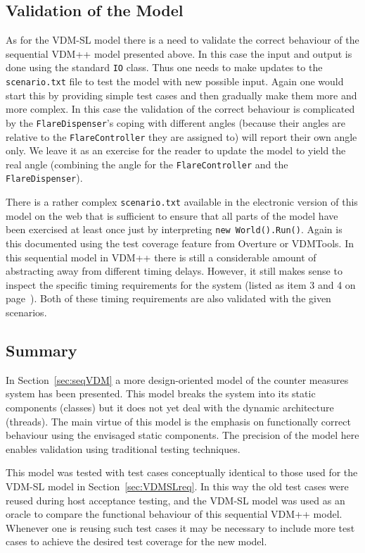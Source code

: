 \documentclass{overturerepchap}
\newcommand{\VDMTools}{VDMTools}
\begin{document}
\subsection{Validation of the Model}

As for the VDM-SL model there is a need to validate the correct behaviour
of the sequential VDM++ model presented above. In this case the input
and output is done using the standard \texttt{IO} class. Thus one needs
to make updates to the \texttt{scenario.txt} file to test the model with
new possible input. Again one would start this by providing simple test
cases and then gradually make them more and more complex. In this case
the validation of the correct behaviour is complicated by the 
\texttt{FlareDispenser}'s coping with different angles (because their 
angles are relative to the \texttt{FlareController} they are assigned to)
will report their own angle only. We leave it as an exercise for the
reader to update the model to yield the real angle (combining the angle
for the \texttt{FlareController} and the \texttt{FlareDispenser}).

There is a rather complex \texttt{scenario.txt} available in the electronic
version of this model on the web that is sufficient to ensure that all parts of the
model have been exercised at least once just by interpreting
\texttt{new World().Run()}. Again is this documented using the
test coverage feature from Overture or 
\VDMTools. In this sequential model in VDM++
there is still a considerable amount of
abstracting away from different timing delays. However, it still makes
sense to inspect the specific timing requirements for the system 
(listed as item 3 and 4 on page~\pageref{timereq34}). Both of these
timing requirements are also validated with the given scenarios.

\subsection{Summary}

In Section~\ref{sec:seqVDM} a more design-oriented model of the
counter measures system has been presented. This model breaks the
system into its static components (classes) but it does not yet deal
with the dynamic architecture (threads). The main virtue of this model
is the emphasis on functionally correct behaviour using the envisaged
static components.  The precision of the model here enables validation
using traditional testing techniques.

This model was tested with test cases conceptually identical to those
used for the VDM-SL model in Section~\ref{sec:VDMSLreq}.  In this way
the old test cases were reused during host acceptance testing, and the
VDM-SL model was used as an oracle to compare the functional behaviour
of this sequential VDM++ model. Whenever one is reusing such test
cases it may be necessary to include more test cases to achieve the
desired test coverage for the new model.
\end{document}
